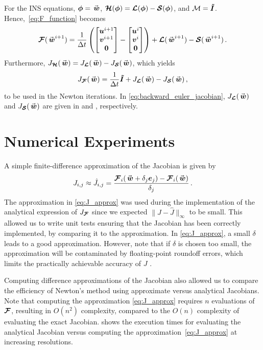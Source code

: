 For the INS equations, $\soln = \wn$, $\bm{\mathcal{H}}(\bm{\phi}) = \bm{\mathcal{L}}(\bm{\phi}) - \bm{\mathcal{S}}(\bm{\phi})$, and $\mathcal{M} = \bm{\tilde{I}}$. Hence,~\eqref{eq:F_function} becomes
\begin{equation}
  \Fn(\wn^{i+1}) = 
  \frac{1}{\Delta t} 
  \left(
    \begin{bmatrix}
      \un^{i+1} \\ \vn^{i+1} \\ \zeron
    \end{bmatrix}
    -
    \begin{bmatrix}
      \un^{i} \\ \vn^{i} \\ \zeron
    \end{bmatrix}
    \right)
    + \euln(\wn^{i+1}) - \satn(\wn^{i+1})
  \, . 
  \label{eq:F_function_euler}
\end{equation}
Furthermore, $J_{\Hn}(\wn) = J_{\euln}(\wn) - J_{\satn}(\wn)$, which yields
\begin{equation}
  J_{\Fn}(\wn) =  
  \frac{1}{\Delta t}
  \Itn
  +
  J_{\euln}(\wn)
  -
  J_{\satn}(\wn)
  \, ,
  \label{eq:backward_euler_jacobian}
\end{equation} 
to be used in the Newton iterations. In \eqref{eq:backward_euler_jacobian}, $J_{\euln}(\wn)$ and $J_{\satn}(\wn)$ are given in  and , respectively.

\section{Numerical Experiments}
\label{sec:numerical_experiments}
A simple finite-difference approximation of the Jacobian is given by \cite{knoll2004jacobian} 
\begin{equation}
  J_{i,j} \approx \hat{J}_{i,j} = \frac{\Fn_i(\wn + \delta_j \en_j) - \Fn_i(\wn)}{\delta_j}
  \, .
  \label{eq:J_approx}
\end{equation}
The approximation in \eqref{eq:J_approx} was used during the implementation of the analytical expression of $J_{\bm{\mathcal{F}}}$ since we expected $\|J - \hat{J}\|_{\infty}$ to be small. This allowed us to write unit tests ensuring that the Jacobian has been correctly implemented, by comparing it to the approximation. In \eqref{eq:J_approx}, a small $\delta$ leads to a good approximation. However, note that if $\delta$ is chosen too small, the approximation will be contaminated by floating-point roundoff errors, which limits the practically achievable accuracy of $J$ \cite{knoll2004jacobian}.

Computing difference approximations of the Jacobian also allowed us to compare the efficiency of Newton's method using approximate versus analytical Jacobians. Note that computing the approximation \eqref{eq:J_approx} requires $n$ evaluations of $\bm{\mathcal{F}}$, resulting in $O(n^2)$ complexity, compared to the $O(n)$ complexity of evaluating the exact Jacobian.  shows the execution times for evaluating the analytical Jacobian versus computing the approximation~\eqref{eq:J_approx} at increasing resolutions.

